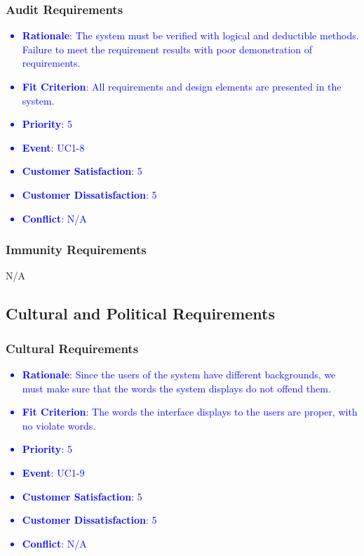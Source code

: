 \documentclass[12pt, titlepage]{article}
\newcounter{reqnum} %
\newcounter{freqnum} %
\begin{document}
\begin{itemize}
\subsubsection{Audit Requirements}
\textcolor{blue}{
\item[NFR\refstepcounter{freqnum}\thefreqnum
\label{NFR}:] 
\begin{itemize}
    \item \textbf{Rationale}: The system must be verified with logical and deductible methods. Failure to meet the requirement results with poor demonstration of requirements.
    \item \textbf{Fit Criterion}: All requirements and design elements are presented in the system. 
    \item \textbf{Priority}: 5
    \item \textbf{Event}: UC1-8%
    \item \textbf{Customer Satisfaction}: 5
    \item \textbf{Customer Dissatisfaction}: 5
    \item \textbf{Conflict}: N/A
\end{itemize}
}
\subsubsection{Immunity Requirements}
N/A
\subsection{Cultural and Political Requirements}

\subsubsection{Cultural Requirements}
\textcolor{blue}{
\item[NFR\refstepcounter{freqnum}\thefreqnum
\label{NFR}:] 
\begin{itemize}
    \item \textbf{Rationale}: Since the users of the system have different backgrounds, we must make sure that the words the system displays do not offend them.
    \item \textbf{Fit Criterion}: The words the interface displays to the users are proper, with no violate words.
    \item \textbf{Priority}: 5
    \item \textbf{Event}: UC1-9%
    \item \textbf{Customer Satisfaction}: 5
    \item \textbf{Customer Dissatisfaction}: 5
    \item \textbf{Conflict}: N/A
\end{itemize}
}


\end{itemize}
\end{document}
